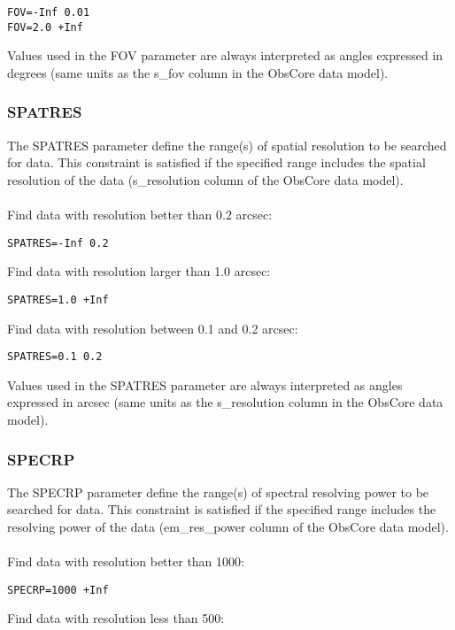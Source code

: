 \documentclass[11pt,a4paper]{ivoa}
\begin{document}
\begin{lstlisting}
FOV=-Inf 0.01
FOV=2.0 +Inf
\end{lstlisting}

Values used in the FOV parameter are always interpreted as angles expressed in degrees (same units as the s\_fov column in the ObsCore data model).

\subsubsection{SPATRES}

The SPATRES parameter define the range(s) of spatial resolution to be searched for data. This constraint is satisfied if the specified range includes the spatial resolution of the data (s\_resolution column of the ObsCore data model). \\ \\
Find data with resolution better than 0.2 arcsec:

\begin{lstlisting}
SPATRES=-Inf 0.2
\end{lstlisting}
Find data with resolution larger than 1.0 arcsec:

\begin{lstlisting}
SPATRES=1.0 +Inf 
\end{lstlisting}
Find data with resolution between 0.1 and 0.2 arcsec:

\begin{lstlisting}
SPATRES=0.1 0.2
\end{lstlisting}

Values used in the SPATRES parameter are always interpreted as angles expressed in arcsec (same units as the s\_resolution column in the ObsCore data model).

\subsubsection{SPECRP}

The SPECRP parameter define the range(s) of spectral resolving power to be searched for data. This constraint is satisfied if the specified range includes the resolving power of the data (em\_res\_power column of the ObsCore data model). \\ \\
Find data with resolution better than 1000:

\begin{lstlisting}
SPECRP=1000 +Inf
\end{lstlisting}
Find data with resolution less than 500:
\end{document}
